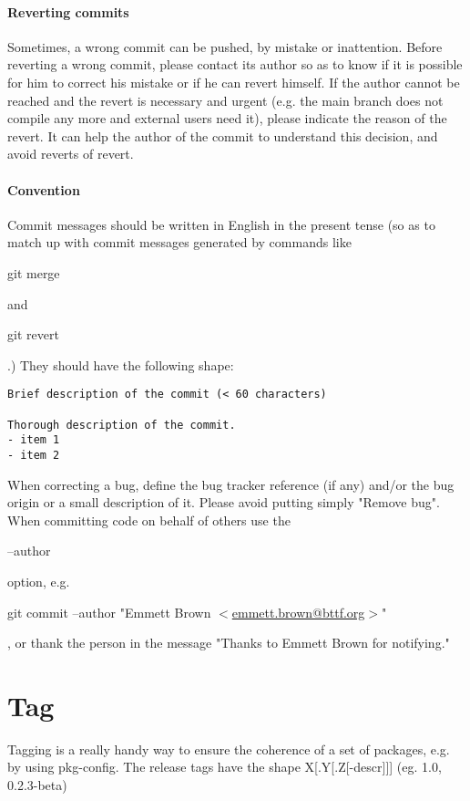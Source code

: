 \paragraph{Reverting commits}

Sometimes, a wrong commit can be pushed, by mistake or inattention.
Before reverting a wrong commit, please contact its author so as to know if it is possible for him to correct his mistake or if he can revert himself.
If the author cannot be reached and the revert is necessary and urgent (e.g. the main branch does not compile any more and external users need it), please indicate the reason of the revert. 
It can help the author of the commit to understand this decision, and avoid reverts of revert.

\paragraph{Convention}
Commit messages should be written in English in the present tense 
(so as to match up with commit messages generated by commands like \begin{tt}git merge\end{tt} and \begin{tt}git revert\end{tt}.)
They should have the following shape:
\begin{verbatim}
Brief description of the commit (< 60 characters)

Thorough description of the commit.
- item 1
- item 2
\end{verbatim}

When correcting a bug, define the bug tracker reference (if any) and/or the bug origin or a small description of it.
Please avoid putting simply "Remove bug".\\

When committing code on behalf of others use the \begin{tt}{--author}\end{tt} option, e.g. \begin{tt}git commit --author "Emmett Brown $<$\url{emmett.brown@bttf.org}$>$"\end{tt},
or thank the person in the message "Thanks to Emmett Brown for notifying."

\section{Tag}
Tagging is a really handy way to ensure the coherence of a set of packages, e.g. by using pkg-config.
The release tags have the shape X[.Y[.Z[-descr]]] (eg. 1.0, 0.2.3-beta)


